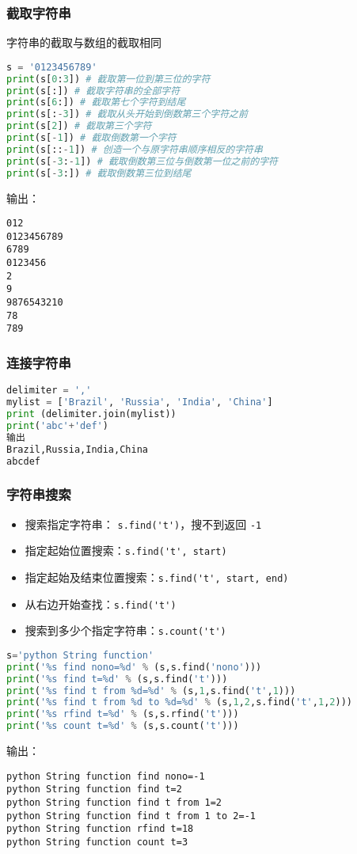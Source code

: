 \subsubsection{截取字符串}
字符串的截取与数组的截取相同
\begin{lstlisting}[language=python]
s = '0123456789'
print(s[0:3]) # 截取第一位到第三位的字符
print(s[:]) # 截取字符串的全部字符
print(s[6:]) # 截取第七个字符到结尾
print(s[:-3]) # 截取从头开始到倒数第三个字符之前
print(s[2]) # 截取第三个字符
print(s[-1]) # 截取倒数第一个字符
print(s[::-1]) # 创造一个与原字符串顺序相反的字符串
print(s[-3:-1]) # 截取倒数第三位与倒数第一位之前的字符
print(s[-3:]) # 截取倒数第三位到结尾
\end{lstlisting}
输出：
\begin{lstlisting}
012
0123456789
6789
0123456
2
9
9876543210
78
789
\end{lstlisting}

\subsubsection{连接字符串}
\begin{lstlisting}[language=python]
delimiter = ','
mylist = ['Brazil', 'Russia', 'India', 'China']
print (delimiter.join(mylist))
print('abc'+'def')
输出
Brazil,Russia,India,China
abcdef
\end{lstlisting}

\subsubsection{字符串搜索}
\begin{itemize}
\item 搜索指定字符串： \verb|s.find('t')|，搜不到返回 \verb|-1|
\item 指定起始位置搜索：\verb|s.find('t', start)|
\item 指定起始及结束位置搜索：\verb|s.find('t', start, end)|
\item 从右边开始查找：\verb|s.find('t')|
\item 搜索到多少个指定字符串：\verb|s.count('t')|
\end{itemize}

\begin{lstlisting}[language=python]
s='python String function'
print('%s find nono=%d' % (s,s.find('nono')))
print('%s find t=%d' % (s,s.find('t')))
print('%s find t from %d=%d' % (s,1,s.find('t',1)))
print('%s find t from %d to %d=%d' % (s,1,2,s.find('t',1,2)))
print('%s rfind t=%d' % (s,s.rfind('t')))
print('%s count t=%d' % (s,s.count('t')))
\end{lstlisting}
输出：
\begin{lstlisting}
python String function find nono=-1
python String function find t=2
python String function find t from 1=2
python String function find t from 1 to 2=-1
python String function rfind t=18
python String function count t=3
\end{lstlisting}


